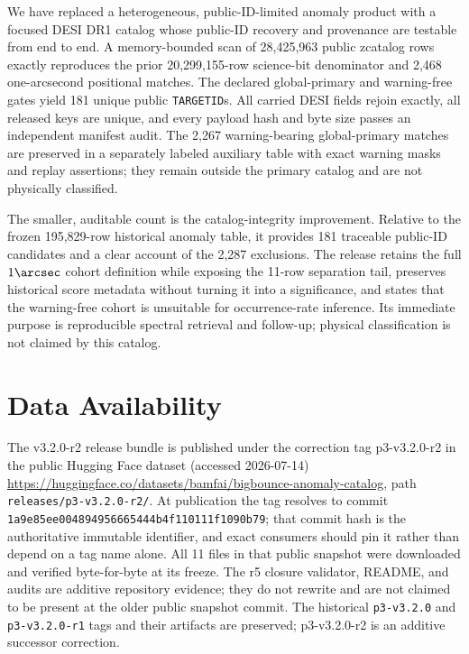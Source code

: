 \documentclass[twocolumn]{aastex701}
\newcommand{\releaseVersion}{v3.2.0-r2}
\newcommand{\releaseTag}{p3-v3.2.0-r2}
\newcommand{\releaseRevision}{1a9e85ee004894956665444b4f110111f1090b79}
\begin{document}
We have replaced a heterogeneous, public-ID-limited anomaly product with a focused DESI DR1
catalog whose public-ID recovery and provenance are testable from end to end.  A memory-bounded scan of
28,425,963 public zcatalog rows exactly reproduces the prior 20,299,155-row science-bit denominator
and 2,468 one-arcsecond positional matches.  The declared global-primary and warning-free gates
yield 181 unique public \texttt{TARGETID}s.  All carried DESI fields rejoin exactly, all released
keys are unique, and every payload hash and byte size passes an independent manifest audit.
The 2,267 warning-bearing global-primary matches are preserved in a separately labeled auxiliary
table with exact warning masks and replay assertions; they remain outside the primary catalog and
are not physically classified.

The smaller, auditable count is the catalog-integrity improvement.  Relative to the frozen
195,829-row historical anomaly table, it provides 181 traceable public-ID candidates and a clear account
of the 2,287 exclusions.  The release retains the full $1\arcsec$ cohort definition while exposing
the 11-row separation tail, preserves historical score metadata without turning it into a
significance, and states that the warning-free cohort is unsuitable for occurrence-rate
inference.  Its immediate purpose is reproducible spectral retrieval and follow-up; physical
classification is not claimed by this catalog.

\section*{Data Availability}

The \releaseVersion{} release bundle is published under the correction tag \releaseTag{} in the
public Hugging Face dataset (accessed 2026-07-14)
\url{https://huggingface.co/datasets/bamfai/bigbounce-anomaly-catalog}, path
\texttt{releases/p3-v3.2.0-r2/}.  At publication the tag resolves to commit
\texttt{\releaseRevision}; that commit hash is the authoritative immutable identifier, and exact
consumers should pin it rather than depend on a tag name alone.  All 11 files in that public
snapshot were downloaded and verified byte-for-byte at its freeze.  The r5 closure validator,
README, and audits are additive repository evidence; they do not rewrite and are not claimed to
be present at the older public snapshot commit.  The
historical \texttt{p3-v3.2.0} and \texttt{p3-v3.2.0-r1} tags and their artifacts are preserved;
\releaseTag{} is an additive successor correction.
\end{document}
